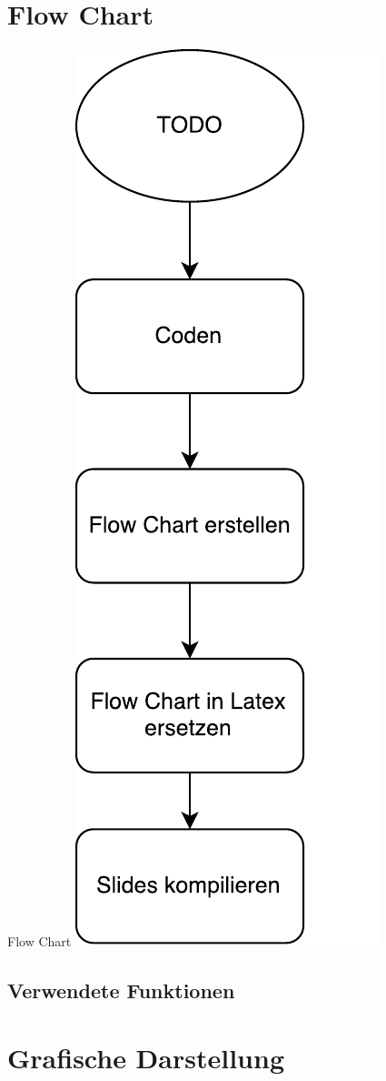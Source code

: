 \section{Flow Chart}
\begin{frame}{Flow Chart}
	\centering
  	\includegraphics[scale=0.3]{FlowChartTodo.pdf}
\end{frame}

\subsection{Verwendete Funktionen}
%

\section{Grafische Darstellung}


